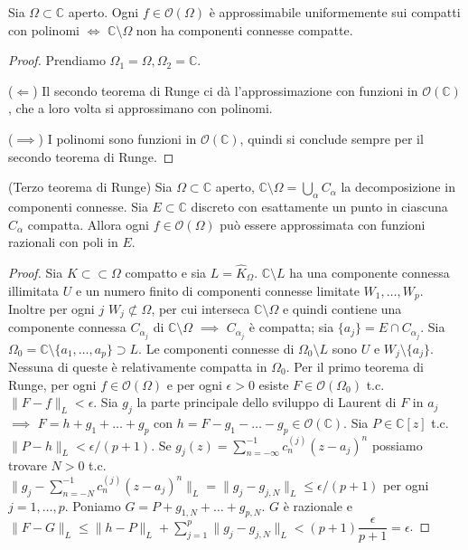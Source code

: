 \begin{cor}
  Sia $\Omega \subset \mathbb{C}$ aperto. Ogni $f \in \mathcal{O}(\Omega)$ è approssimabile uniformemente sui compatti con polinomi $\iff$ $\mathbb{C}\setminus \Omega$ non ha componenti connesse compatte.
\end{cor}

\begin{proof}
  Prendiamo $\Omega_1=\Omega, \Omega_2=\mathbb{C}$.

  ($\Leftarrow$) Il secondo teorema di Runge ci dà l'approssimazione con funzioni in $\mathcal{O}(\mathbb{C})$, che a loro volta si approssimano con polinomi.

  ($\implies$) I polinomi sono funzioni in $\mathcal{O}(\mathbb{C})$, quindi si conclude sempre per il secondo teorema di Runge.
\end{proof}

\begin{thm}
  (Terzo teorema di Runge) Sia $\Omega \subset \mathbb{C}$ aperto, $\displaystyle \mathbb{C}\setminus \Omega=\bigcup_{\alpha}C_{\alpha}$ la decomposizione in componenti connesse. Sia $E \subset \mathbb{C}$ discreto con esattamente un punto in ciascuna $C_{\alpha}$ compatta. Allora ogni $f \in \mathcal{O}(\Omega)$ può essere approssimata con funzioni razionali con poli in $E$.
\end{thm}

\begin{proof}
  Sia $K \subset \subset \Omega$ compatto e sia $L=\widehat{K}_{\Omega}$. $\mathbb{C}\setminus L$ ha una componente connessa illimitata $U$ e un numero finito di componenti connesse limitate $W_1, \dots, W_p$.
  Inoltre per ogni $j$ $W_j \not\subset \Omega$, per cui interseca $\mathbb{C}\setminus\Omega$ e quindi contiene una componente connessa $C_{\alpha_j}$ di $\mathbb{C}\setminus \Omega$ $\implies$ $C_{\alpha_j}$ è compatta; sia $\{a_j\}=E\cap C_{\alpha_j}$.
  Sia $\Omega_0=\mathbb{C}\setminus\{a_1, \dots, a_p\} \supset L$. Le componenti connesse di $\Omega_0 \setminus L$ sono $U$ e $W_j \setminus \{a_j\}$. Nessuna di queste è relativamente compatta in $\Omega_0$.
  Per il primo teorema di Runge, per ogni $f \in \mathcal{O}(\Omega)$ e per ogni $\epsilon>0$ esiste $F \in \mathcal{O}(\Omega_0)$ t.c. $\|F-f\|_L<\epsilon$. Sia $g_j$ la parte principale dello sviluppo di Laurent di $F$ in $a_j$ $\implies$ $F=h+g_1+\dots+g_p$ con $h=F-g_1-\dots-g_p \in \mathcal{O}(\mathbb{C})$.
  Sia $P \in \mathbb{C}[z]$ t.c. $\|P-h\|_L<\epsilon/(p+1)$. Se $\displaystyle g_j(z)=\sum_{n=-\infty}^{-1} c_n^{(j)}(z-a_j)^n$ possiamo trovare $N>0$ t.c. $\displaystyle \|g_j-\sum_{n=-N}^{-1} c_n^{(j)}(z-a_j)^n\|_L=\|g_j-g_{j,N}\|_L \le \epsilon/(p+1)$ per ogni $j=1, \dots, p$.
  Poniamo $G=P+g_{1,N}+\dots+g_{p,N}$. $G$ è razionale e $\displaystyle \|F-G\|_L \le \|h-P\|_L+\sum_{j=1}^p \|g_j-g_{j,N}\|_L<(p+1) \dfrac{\epsilon}{p+1}=\epsilon$.
\end{proof}

